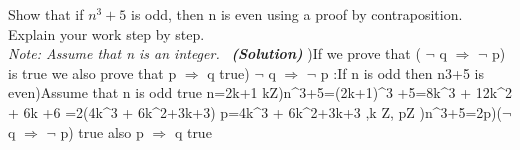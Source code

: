 \documentclass[a4 paper]{article}
\numberwithin{equation}{section}
\newcommand{\solution}{~\newline\textbf{\textit{(Solution)}} }
\newcommand{\0}{\mathbf{0}}
\begin{document}
Show that if $n^3 + 5$ is odd, then n is even using a proof by contraposition. Explain your work step by step.\\
\textit{Note: Assume that n is an integer.}
\solution
)If we prove that ( $\neg$ q $\Rightarrow$ $\neg$ p)  is true we also prove that p $\Rightarrow$ q true\newline{}) $\neg$ q $\Rightarrow$ $\neg$ p :If n is odd then n3+5 is even)Assume that n is odd true\newline
n=2k+1  k\varepsilon Z)n^3+5=(2k+1)^3 +5=8k^3 + 12k^2 + 6k +6 =2(4k^3 + 6k^2+3k+3)\newline
p=4k^3 + 6k^2+3k+3 ,k   \varepsilon  Z, p\varepsilon Z )n^3+5=2p)($\neg$ q $\Rightarrow$ $\neg$ p) true\newline
also p $\Rightarrow$ q true
\end{document}
